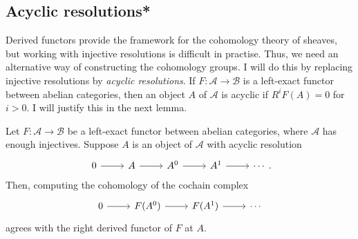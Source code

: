 \subsection{Acyclic resolutions*}
Derived functors provide the framework for the cohomology theory of
sheaves, but working with injective resolutions is difficult in practise.
Thus, we need an alternative way of constructing the cohomology groups.
I will do this by replacing injective resolutions by \emph{acyclic
  resolutions}. If $F:\mathcal{A}\to\mathcal{B}$ is a left-exact
functor between abelian categories, then an object $A$ of $\mathcal{A}$ is
acyclic if $R^{i}F(A)=0$ for $i>0$. I will justify this in the
next lemma.
\begin{lemm}
  Let $F:\mathcal{A}\to\mathcal{B}$ be a left-exact functor
  between abelian categories, where $\mathcal{A}$ has enough injectives.
  Suppose $A$ is an object of $\mathcal{A}$ with acyclic resolution
  \[\begin{tikzcd}
      0\rar & A\rar & A^{0}\rar & A^{1}\rar & \cdots
    \end{tikzcd}.\]
  Then, computing the cohomology of the cochain complex
  \[\begin{tikzcd}
      0\rar & F(A^{0})\rar & F(A^{1})\rar & \cdots
    \end{tikzcd}\]
  agrees with the right derived functor of $F$ at $A$.
\end{lemm}
